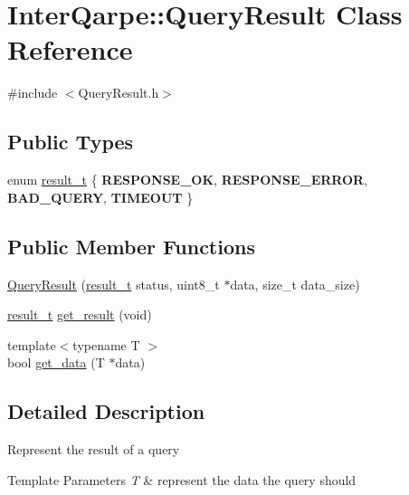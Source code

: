 \hypertarget{classInterQarpe_1_1QueryResult}{}\section{Inter\+Qarpe\+:\+:Query\+Result Class Reference}
\label{classInterQarpe_1_1QueryResult}


{\ttfamily \#include $<$Query\+Result.\+h$>$}

\subsection*{Public Types}
\begin{DoxyCompactItemize}
\item 
enum \hyperlink{classInterQarpe_1_1QueryResult_ad265093e5dea69f229df989d4e18cbb4}{result\+\_\+t} \{ {\bfseries R\+E\+S\+P\+O\+N\+S\+E\+\_\+\+OK}, 
{\bfseries R\+E\+S\+P\+O\+N\+S\+E\+\_\+\+E\+R\+R\+OR}, 
{\bfseries B\+A\+D\+\_\+\+Q\+U\+E\+RY}, 
{\bfseries T\+I\+M\+E\+O\+UT}
 \}
\end{DoxyCompactItemize}
\subsection*{Public Member Functions}
\begin{DoxyCompactItemize}
\item 
\hyperlink{classInterQarpe_1_1QueryResult_a352263dc06a25fbb1c6ac075ac8a7420}{Query\+Result} (\hyperlink{classInterQarpe_1_1QueryResult_ad265093e5dea69f229df989d4e18cbb4}{result\+\_\+t} status, uint8\+\_\+t $\ast$data, size\+\_\+t data\+\_\+size)
\item 
\hyperlink{classInterQarpe_1_1QueryResult_ad265093e5dea69f229df989d4e18cbb4}{result\+\_\+t} \hyperlink{classInterQarpe_1_1QueryResult_a6197ac1a1b4524be0e5643c96b1d24df}{get\+\_\+result} (void)
\item 
{\footnotesize template$<$typename T $>$ }\\bool \hyperlink{classInterQarpe_1_1QueryResult_a2a128d20e11bf7118844c73ec2035c76}{get\+\_\+data} (T $\ast$data)
\end{DoxyCompactItemize}


\subsection{Detailed Description}
Represent the result of a query 
\begin{DoxyTemplParams}{Template Parameters}
{\em T} & represent the data the query should \\
\hline
\end{DoxyTemplParams}


